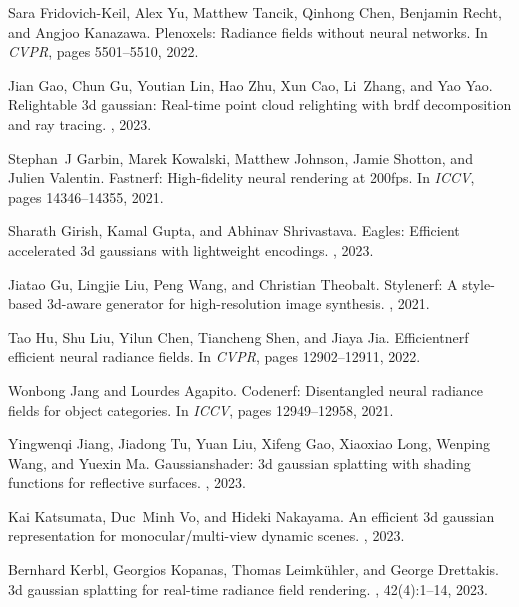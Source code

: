 \documentclass{article}
\begin{document}
{\begin{thebibliography}{10}
Sara Fridovich-Keil, Alex Yu, Matthew Tancik, Qinhong Chen, Benjamin Recht, and Angjoo Kanazawa.
\newblock Plenoxels: Radiance fields without neural networks.
\newblock In {\em CVPR}, pages 5501--5510, 2022.

Jian Gao, Chun Gu, Youtian Lin, Hao Zhu, Xun Cao, Li~Zhang, and Yao Yao.
\newblock Relightable 3d gaussian: Real-time point cloud relighting with brdf decomposition and ray tracing.
, 2023.

Stephan~J Garbin, Marek Kowalski, Matthew Johnson, Jamie Shotton, and Julien Valentin.
\newblock Fastnerf: High-fidelity neural rendering at 200fps.
\newblock In {\em ICCV}, pages 14346--14355, 2021.

Sharath Girish, Kamal Gupta, and Abhinav Shrivastava.
\newblock Eagles: Efficient accelerated 3d gaussians with lightweight encodings.
, 2023.

Jiatao Gu, Lingjie Liu, Peng Wang, and Christian Theobalt.
\newblock Stylenerf: A style-based 3d-aware generator for high-resolution image synthesis.
, 2021.

Tao Hu, Shu Liu, Yilun Chen, Tiancheng Shen, and Jiaya Jia.
\newblock Efficientnerf efficient neural radiance fields.
\newblock In {\em CVPR}, pages 12902--12911, 2022.

Wonbong Jang and Lourdes Agapito.
\newblock Codenerf: Disentangled neural radiance fields for object categories.
\newblock In {\em ICCV}, pages 12949--12958, 2021.

Yingwenqi Jiang, Jiadong Tu, Yuan Liu, Xifeng Gao, Xiaoxiao Long, Wenping Wang, and Yuexin Ma.
\newblock Gaussianshader: 3d gaussian splatting with shading functions for reflective surfaces.
, 2023.

Kai Katsumata, Duc~Minh Vo, and Hideki Nakayama.
\newblock An efficient 3d gaussian representation for monocular/multi-view dynamic scenes.
, 2023.

Bernhard Kerbl, Georgios Kopanas, Thomas Leimk{\"u}hler, and George Drettakis.
\newblock 3d gaussian splatting for real-time radiance field rendering.
, 42(4):1--14, 2023.


\end{thebibliography}}
\end{document}
